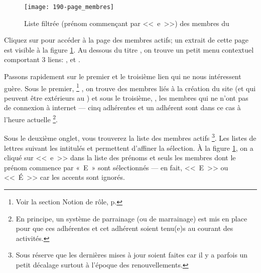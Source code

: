 
\label{sec:membres}

\begin{figure}
    \texttt{[image: 190-page\_membres]}
    \caption[Liste filtrée des membres du \CdS]{Liste filtrée (prénom commençant par <<~e~>>) des membres du \CdS}
    \label{fig:pageMembres}
\end{figure}
Cliquez sur  pour accéder à la page des membres actifs; un extrait de cette page est visible à la figure \ref{fig:pageMembres}. Au dessous du titre , on trouve un petit menu contextuel comportant 3 liens: ,  et .

Passons rapidement sur le premier et le troisième lien qui ne nous intéressent guère. Sous le premier, %
\footnote{Voir la section \og Notion de rôle\fg, p. \pageref{sec:responsabilitesSite} }
, on trouve des membres liés à la création du site (et qui peuvent être extérieurs au \sel) et sous le troisième, , les membres qui ne n’ont pas de connexion à internet --- cinq adhérentes et un adhérent sont dans ce cas à l’heure actuelle%
\footnote{En principe, un système de parrainage (ou de marrainage) est mis en place pour que ces adhérentes et cet adhérent soient tenu(e)s au courant des activités.}.

Sous le deuxième onglet, vous trouverez la liste des membres actifs%
\footnote{Sous réserve que les dernières mises à jour soient faites car il  y a parfois un petit décalage surtout à l’époque des renouvellements.}.
Les listes de lettres suivant les intitulés  et  permettent d’affiner la sélection. À la figure \ref{fig:pageMembres}, on a cliqué sur <<~e~>> dans la liste des prénoms et seuls les membres dont le prénom commence par «~E~» sont sélectionnés --- en fait,  <<~E~>> ou <<~É~>> car les accents sont ignorés.

